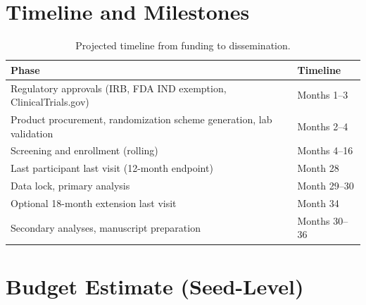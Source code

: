 \documentclass[11pt,a4paper]{article}
\begin{document}
\section{Timeline and Milestones}

\begin{table}[H]
\centering
\caption{Projected timeline from funding to dissemination.}
\begin{tabularx}{\textwidth}{lX}
\toprule
\textbf{Phase} & \textbf{Timeline} \\
\midrule
Regulatory approvals (IRB, FDA IND exemption, ClinicalTrials.gov) & Months 1--3 \\
Product procurement, randomization scheme generation, lab validation & Months 2--4 \\
Screening and enrollment (rolling) & Months 4--16 \\
Last participant last visit (12-month endpoint) & Month 28 \\
Data lock, primary analysis & Month 29--30 \\
Optional 18-month extension last visit & Month 34 \\
Secondary analyses, manuscript preparation & Months 30--36 \\
\bottomrule
\end{tabularx}
\end{table}

\section{Budget Estimate (Seed-Level)}
\end{document}
